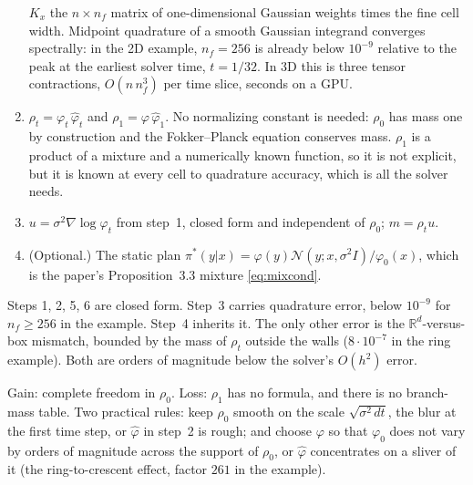 \documentclass[11pt]{article}
\newcommand{\R}{\mathbb{R}}
\newcommand{\Nc}{\mathcal{N}}
\newcommand{\hphi}{\hat\varphi}
\theoremstyle{definition}
\theoremstyle{plain}
\begin{document}
\begin{description}[leftmargin=1.5em,itemsep=2pt]
\begin{enumerate}[itemsep=1pt]
            $K_x$ the $n\times n_f$ matrix of one-dimensional Gaussian weights times the fine
            cell width. Midpoint quadrature of a smooth Gaussian integrand converges
            spectrally: in the 2D example, $n_f=256$ is already below $10^{-9}$ relative to the
            peak at the earliest solver time, $t=1/32$. In 3D this is three tensor contractions,
            $O(n\,n_f^3)$ per time slice, seconds on a GPU.
      \item $\rho_t=\varphi_t\,\hphi_t$ and $\rho_1=\varphi\,\hphi_1$. No normalizing constant
            is needed: $\rho_0$ has mass one by construction and the Fokker--Planck equation
            conserves mass. $\rho_1$ is a product of a mixture and a numerically known
            function, so it is not explicit, but it is known at every cell to quadrature
            accuracy, which is all the solver needs.
      \item $u=\sigma^2\nabla\log\varphi_t$ from step~1, closed form and independent of
            $\rho_0$; $m=\rho_tu$.
      \item (Optional.) The static plan $\pi^*(y|x)=\varphi(y)\Nc(y;x,\sigma^2I)/\varphi_0(x)$,
            which is the paper's Proposition~3.3 mixture \eqref{eq:mixcond}.
    \end{enumerate}
  \item[What is exact and what is not.] Steps 1, 2, 5, 6 are closed form. Step~3 carries
    quadrature error, below $10^{-9}$ for $n_f\ge256$ in the example. Step~4 inherits it.
    The only other error is the $\R^d$-versus-box mismatch, bounded by the mass of $\rho_t$
    outside the walls ($8\cdot10^{-7}$ in the ring example). Both are orders of magnitude
    below the solver's $O(h^2)$ error.
  \item[Gain and loss.] Gain: complete freedom in $\rho_0$. Loss: $\rho_1$ has no formula, and
    there is no branch-mass table. Two practical rules: keep $\rho_0$ smooth on the scale
    $\sqrt{\sigma^2\,dt}$, the blur at the first time step, or $\hphi$ in step~2 is rough; and
    choose $\varphi$ so that $\varphi_0$ does not vary by orders of magnitude across the
    support of $\rho_0$, or $\hphi$ concentrates on a sliver of it (the ring-to-crescent
    effect, factor $261$ in the example).
\end{description}
\end{document}

